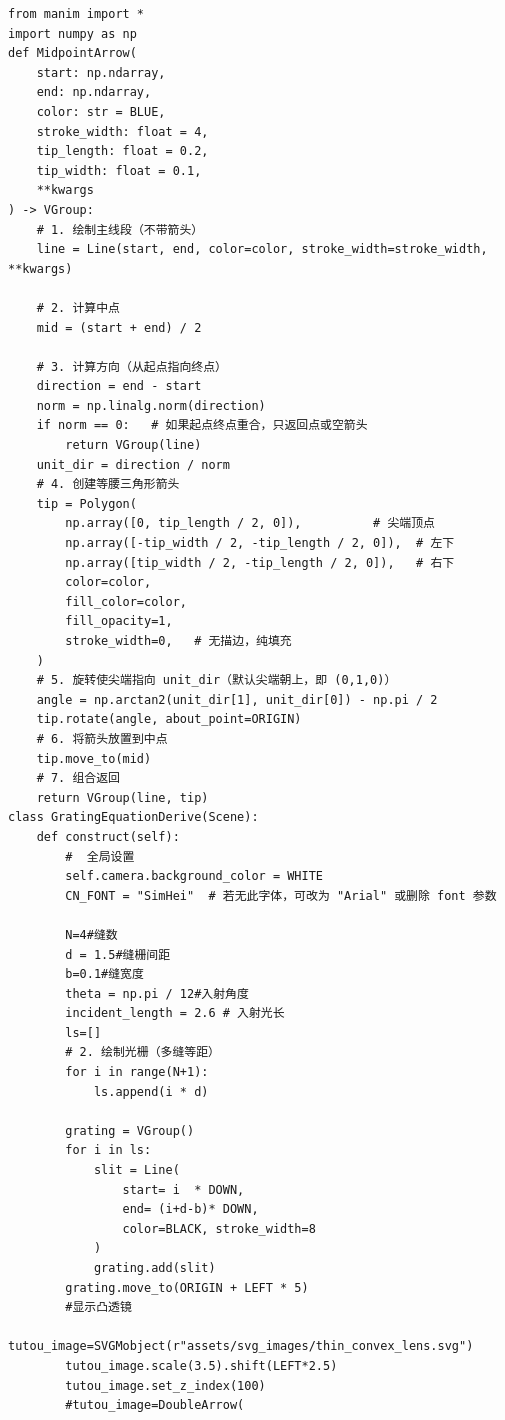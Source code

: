 \documentclass[12pt,a4paper]{ctexrep}
\begin{document}
\begin{lstlisting}[style=pycode]
from manim import *
import numpy as np
def MidpointArrow(
    start: np.ndarray,
    end: np.ndarray,
    color: str = BLUE,
    stroke_width: float = 4,
    tip_length: float = 0.2,
    tip_width: float = 0.1,
    **kwargs
) -> VGroup:
    # 1. 绘制主线段（不带箭头）
    line = Line(start, end, color=color, stroke_width=stroke_width, **kwargs)

    # 2. 计算中点
    mid = (start + end) / 2

    # 3. 计算方向（从起点指向终点）
    direction = end - start
    norm = np.linalg.norm(direction)
    if norm == 0:   # 如果起点终点重合，只返回点或空箭头
        return VGroup(line)
    unit_dir = direction / norm
    # 4. 创建等腰三角形箭头
    tip = Polygon(
        np.array([0, tip_length / 2, 0]),          # 尖端顶点
        np.array([-tip_width / 2, -tip_length / 2, 0]),  # 左下
        np.array([tip_width / 2, -tip_length / 2, 0]),   # 右下
        color=color,
        fill_color=color,
        fill_opacity=1,
        stroke_width=0,   # 无描边，纯填充
    )
    # 5. 旋转使尖端指向 unit_dir（默认尖端朝上，即 (0,1,0)）
    angle = np.arctan2(unit_dir[1], unit_dir[0]) - np.pi / 2
    tip.rotate(angle, about_point=ORIGIN)
    # 6. 将箭头放置到中点
    tip.move_to(mid)
    # 7. 组合返回
    return VGroup(line, tip)
class GratingEquationDerive(Scene):
    def construct(self):
        #  全局设置
        self.camera.background_color = WHITE
        CN_FONT = "SimHei"  # 若无此字体，可改为 "Arial" 或删除 font 参数

        N=4#缝数
        d = 1.5#缝栅间距
        b=0.1#缝宽度
        theta = np.pi / 12#入射角度
        incident_length = 2.6 # 入射光长
        ls=[]
        # 2. 绘制光栅（多缝等距）
        for i in range(N+1):
            ls.append(i * d)

        grating = VGroup()
        for i in ls:
            slit = Line(
                start= i  * DOWN,
                end= (i+d-b)* DOWN,
                color=BLACK, stroke_width=8
            )
            grating.add(slit)
        grating.move_to(ORIGIN + LEFT * 5)
        #显示凸透镜
        tutou_image=SVGMobject(r"assets/svg_images/thin_convex_lens.svg")
        tutou_image.scale(3.5).shift(LEFT*2.5)
        tutou_image.set_z_index(100)
        #tutou_image=DoubleArrow(


\end{lstlisting}
\end{document}
